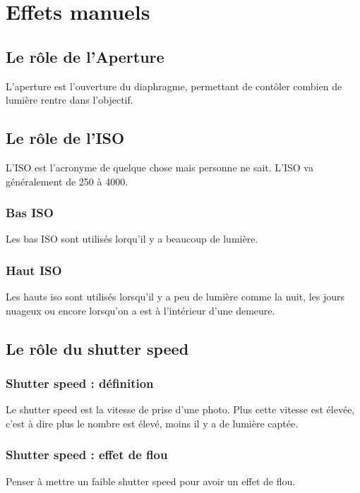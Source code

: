 \documentclass{article}
\begin{document}
\maketitle

\section{Effets manuels}
\subsection{Le rôle de l'Aperture}
L'aperture est l'ouverture du diaphragme, permettant de contôler combien de lumière rentre dans l'objectif.
\subsection{Le rôle de l'ISO}
L'ISO est l'acronyme de quelque chose mais personne ne sait. L'ISO va généralement de 250 à 4000.

\subsubsection{Bas ISO}
Les bas ISO sont utilisés lorqu'il y a beaucoup de lumière.

\subsubsection{Haut ISO}
Les hauts iso sont utilisés lorsqu'il y a peu de lumière comme la nuit, les jours nuageux ou encore lorsqu'on a est à l'intérieur d'une demeure.

\subsection{Le rôle du shutter speed}

\subsubsection{Shutter speed : définition}

Le shutter speed est la vitesse de prise d'une photo. Plus cette vitesse est élevée, c'est à dire plus le nombre est élevé, moins il y a de lumière captée.

\subsubsection{Shutter speed : effet de flou}
Penser à mettre un faible shutter speed pour avoir un effet de flou.
\end{document}
